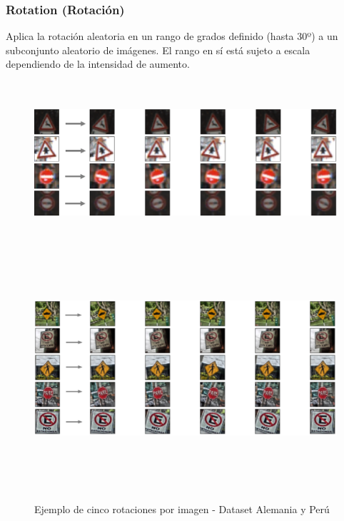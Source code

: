 		\subsubsection{Rotation (Rotación)}
			Aplica la rotación aleatoria en un rango de grados definido (hasta 30º) a un subconjunto aleatorio de imágenes.
	        El rango en sí está sujeto a escala dependiendo de la intensidad de aumento.

	        \begin{figure}[H]
				\begin{center}
				\includegraphics[width=1\textwidth,height=6cm]{images/desarrollo/Augment/fixedrotation3}
				\includegraphics[width=1\textwidth,height=9cm]{images/desarrollo/Augment/fixedrotation2}
				\end{center}
				\begin{center}
				\caption{\small{Ejemplo de cinco rotaciones por imagen - Dataset Alemania y Perú}}
				{\small{\fontsize{10}{16.8}\selectfont {Fuente: Elaboración propia}}}
				\end{center}
				\vspace{-1.5em}
			\end{figure}
	    
